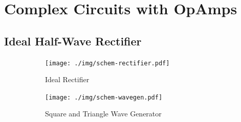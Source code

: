 \chapter{Complex Circuits with OpAmps}
\section{Ideal Half-Wave Rectifier}

\begin{figure}
	\centering
	\begin{subfigure}{0.44\textwidth}
		\centering
		\texttt{[image: ./img/schem-rectifier.pdf]}
		\caption{Ideal Rectifier}
		\label{schem:rectifier}
	\end{subfigure}
	\begin{subfigure}{0.55\textwidth}
		\centering
		\texttt{[image: ./img/schem-wavegen.pdf]}
		\caption{Square and Triangle Wave Generator}
		\label{schem:wavegen}
	\end{subfigure}
	\caption[Schematics of Wave Generator and Ideal Rectifier]{}
\end{figure}

